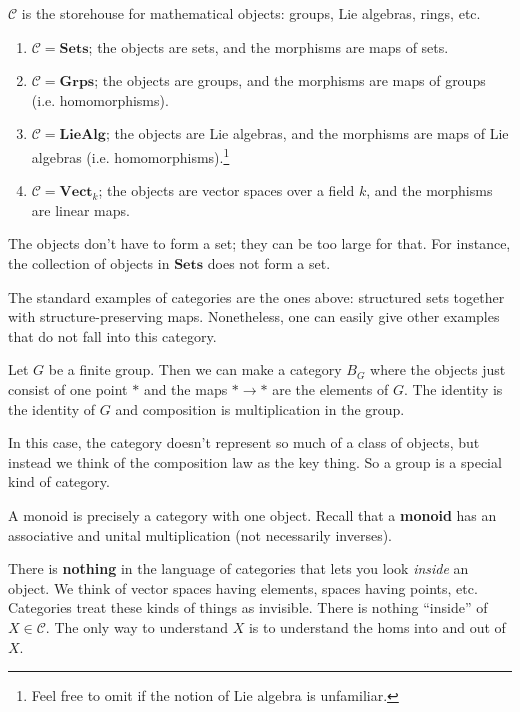 $\mathcal{C}$ is the storehouse for mathematical objects: groups, Lie algebras,
rings, etc.
\begin{example} 
\begin{enumerate}
\item $\mathcal{C}  = \mathbf{Sets}$; the objects are sets, and the morphisms
are maps of sets. 
\item $\mathcal{C} = \mathbf{Grps}$; the objects are groups, and the morphisms
are maps of groups (i.e. homomorphisms).
\item $\mathcal{C} = \mathbf{LieAlg}$; the objects are Lie algebras, and the
morphisms are maps of Lie algebras (i.e. homomorphisms).\footnote{Feel free to
omit if the notion of Lie algebra is unfamiliar.}
\item  $\mathcal{C} = \mathbf{Vect}_k$; the objects are vector spaces over a
field $k$, and the morphisms are linear maps. 
\end{enumerate}
\end{example} 



\begin{remark} 
The objects don't have to form a set; they can be too large for
that.
For instance, the collection of objects in $\mathbf{Sets}$ does not form a set. 
\end{remark} 

The standard examples of categories are the ones above: structured sets
together with structure-preserving maps. Nonetheless, one can easily give
other examples that do not fall into this category.

\begin{example} 
Let $G$ be a finite group. Then we can make a category $B_G$ where the objects
just consist of one point $\ast$ and the maps $\ast \to \ast$ are the elements
of $G$. The identity is the identity of $G$ and composition is multiplication
in the group. 

In this case, the category doesn't represent so much of a class of objects, but
instead we think of the composition law as the key thing. So a group is a
special kind of category.
\end{example} 

\begin{example} 
A monoid is precisely a category with one object. Recall that a \textbf{monoid}
has an associative and unital multiplication (not necessarily inverses).
\end{example} 


There is \textbf{nothing} in the language of categories that lets you look
\emph{inside} an object. We think of vector spaces having elements, spaces
having points, etc. Categories treat these kinds of things as invisible. There
is nothing ``inside'' of $X \in \mathcal{C}$. The only way to understand $X$ is
to understand the homs into and out of $X$. 

